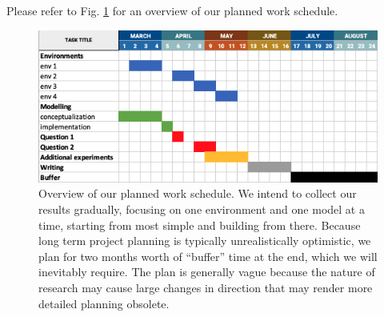 \documentclass[../main.tex]{subfiles}
\begin{document}
Please refer to Fig. \ref{fig:planning} for an overview of our planned work schedule.

\begin{figure}[h]
\centering
\includegraphics[width=\textwidth]{../images/plan.png}
\caption{Overview of our planned work schedule. We intend to collect our results gradually, focusing
	on one environment and one model at a time, starting from most simple and building from there.
	Because long term project planning is typically unrealistically optimistic, we plan for two months
	worth of ``buffer'' time at the end, which we will inevitably require. The plan is generally vague
because the nature of research may cause large changes in direction that may render more detailed
planning obsolete.}
\label{fig:planning}
\end{figure}


\ifSubfilesClassLoaded{%
	
}{}
\end{document}
